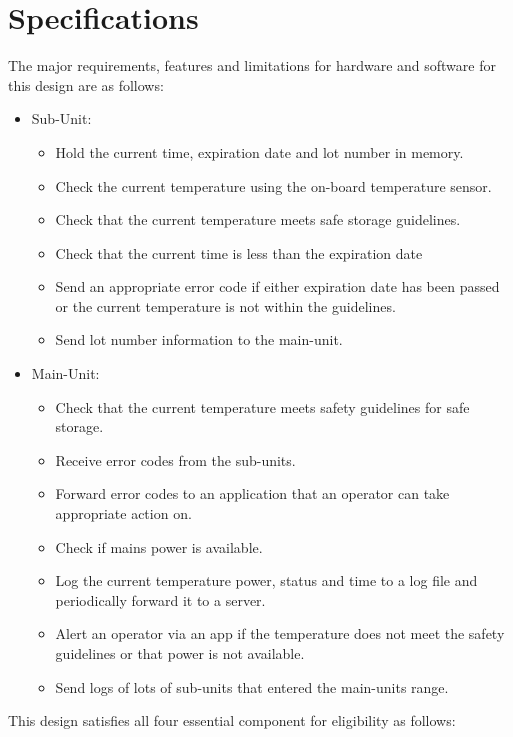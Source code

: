 \section{Specifications}
The major requirements, features and limitations for hardware and software for this design are as follows:
\begin{itemize}
  \item Sub-Unit:
        \begin{itemize}
          \item Hold the current time, expiration date and lot number in memory.
          \item Check the current temperature using the on-board temperature sensor.
          \item Check that the current temperature meets safe storage guidelines.
          \item Check that the current time is less than the expiration date
          \item Send an appropriate error code if either expiration date has been passed or the current temperature is not within the guidelines.
                \item Send lot number information to the main-unit.
        \end{itemize}
  \item Main-Unit:
        \begin{itemize}
          \item Check that the current temperature meets safety guidelines for safe storage.
          \item Receive error codes from the sub-units.
          \item Forward error codes to an application that an operator can take appropriate action on.
          \item Check if mains power is available.
          \item Log the current temperature power, status and time to a log file and periodically forward it to a server.
          \item Alert an operator via an app if the temperature does not meet the safety guidelines or that power is not available.
          \item Send logs of lots of sub-units that entered the main-units range.
        \end{itemize}
\end{itemize}
This design satisfies all four essential component for eligibility as follows:
